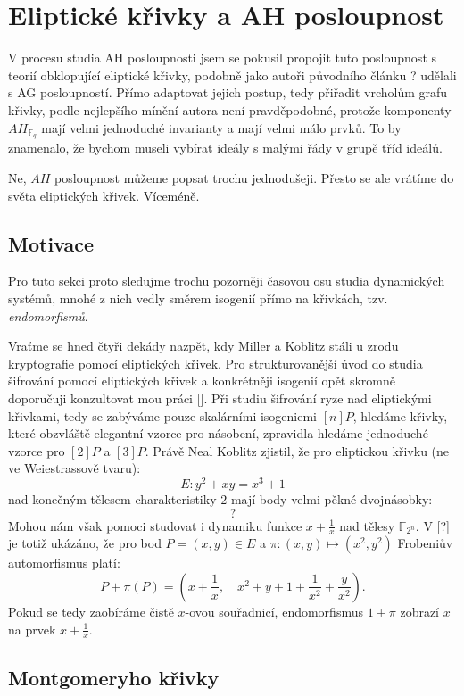 \documentclass[12pt]{report}
\begin{document}
\chapter{Eliptické křivky a AH posloupnost}

V procesu studia AH posloupnosti jsem se pokusil propojit tuto posloupnost s teorií obklopující eliptické křivky, podobně jako autoři původního článku ? udělali s AG posloupností. Přímo adaptovat jejich postup, tedy přiřadit vrcholům grafu křivky, podle nejlepšího mínění autora není pravděpodobné, protože komponenty $AH_{\mathbb{F}_q}$ mají velmi jednoduché invarianty a mají velmi málo prvků. To by znamenalo, že bychom museli vybírat ideály s malými řády v grupě tříd ideálů. 

Ne, $AH$ posloupnost můžeme popsat trochu jednodušeji. Přesto se ale vrátíme do světa eliptických křivek. Víceméně.

\section{Motivace}

Pro tuto sekci proto sledujme trochu pozorněji časovou osu studia dynamických systémů, mnohé z nich vedly směrem isogenií přímo na křivkách, tzv. \textit{endomorfismů}.

Vraťme se hned čtyři dekády nazpět, kdy Miller a Koblitz stáli u zrodu kryptografie pomocí eliptických křivek. Pro strukturovanější úvod do studia šifrování pomocí eliptických křivek a konkrétněji isogenií opět skromně doporučuji konzultovat mou práci []. Při studiu šifrování ryze nad eliptickými křivkami, tedy se zabýváme pouze skalárními isogeniemi $[n]P$, hledáme křivky, které obzvláště elegantní vzorce pro násobení, zpravidla hledáme jednoduché vzorce pro $[2]P$ a $[3]P$. Právě Neal Koblitz zjistil, že pro eliptickou křivku (ne ve Weiestrassově tvaru):
$$E : y^2 + xy = x^3 + 1$$
nad konečným tělesem charakteristiky $2$ mají body velmi pěkné dvojnásobky:
$$?$$ 
Mohou nám však pomoci studovat i dynamiku funkce $x + \frac{1}{x}$ nad tělesy $\mathbb{F}_{2^n}$. V [?] je totiž ukázáno, že pro bod $P = (x,y) \in E$ a $\pi : (x,y) \longmapsto (x^2,y^2)$ Frobeniův automorfismus platí:
$$P + \pi (P) = \left(x + \frac{1}{x} , \quad x^2 + y + 1 + \frac{1}{x^2} + \frac{y}{x^2} \right).$$
Pokud se tedy zaobíráme čistě $x$-ovou souřadnicí, endomorfismus $1+\pi$ zobrazí $x$ na prvek $x+\frac{1}{x}$.


\section{Montgomeryho křivky}
\end{document}

